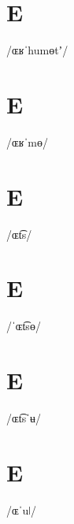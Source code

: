 \documentclass[10pt,a4paper,twoside]{book}
\begin{document}
\section*{E}

\begin{multicols}{3}
 {/ɶʁˈhumɵtʼ/} {}
\end{multicols}

\section*{E}

\begin{multicols}{3}
 {/ɶʁˈmɵ/} {}
\end{multicols}

\section*{E}

\begin{multicols}{3}
 {/ɶt͡s/} {}
\end{multicols}

\section*{E}

\begin{multicols}{3}
 {/ˈɶt͡sɵ/} {}
\end{multicols}

\section*{E}

\begin{multicols}{3}
 {/ɶt͡sˈʉ/} {}
\end{multicols}

\section*{E}

\begin{multicols}{3}
 {/ɶˈuǀ/} {}
\end{multicols}
\end{document}

